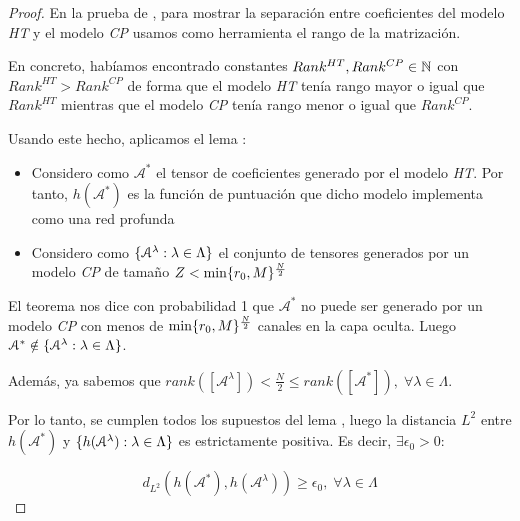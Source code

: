 \begin{proof}

    En la prueba de , para mostrar la separación entre coeficientes del modelo \textit{HT} y el modelo \textit{CP} usamos como herramienta el rango de la matrización.

    En concreto, habíamos encontrado constantes $Rank^{HT}, Rank^{CP} \in \mathbb{N}$ con $Rank^{HT} > Rank^{CP}$ de forma que el modelo \textit{HT} tenía rango mayor o igual que $Rank^{HT}$ mientras que el modelo \textit{CP} tenía rango menor o igual que $Rank^{CP}$.

    Usando este hecho, aplicamos el lema :

    \begin{itemize}
        \item Considero como $\mathcal{A}^*$ el tensor de coeficientes generado por el modelo \textit{HT}. Por tanto, $h(\mathcal{A}^*)$ es la función de puntuación que dicho modelo implementa como una red profunda
        \item Considero como $\{ \mathcal{A}^\lambda: \lambda \in \Lambda \}$ el conjunto de tensores generados por un modelo \textit{CP} de tamaño $Z < \min \{ r_0, M \}^{\frac{N}{2}}$
    \end{itemize}

    El teorema  nos dice con probabilidad 1 que $\mathcal{A}^*$ no puede ser generado por un modelo \textit{CP} con menos de $\min \{ r_0, M \}^{\frac{N}{2}}$ canales en la capa oculta. Luego $\mathcal{A}^* \notin \{ \mathcal{A}^\lambda: \lambda \in \Lambda \}$.

    Además, ya sabemos que $rank([\mathcal{A}^\lambda]) < \frac{N}{2} \leq rank([\mathcal{A}^*]), \; \forall \lambda \in \Lambda$.

    Por lo tanto, se cumplen todos los supuestos del lema , luego la distancia $L^2$ entre $h(\mathcal{A}^*)$ y $\{ h(\mathcal{A}^\lambda): \lambda \in \Lambda \}$ es estrictamente positiva. Es decir, $\exists \epsilon_0 > 0:$

    \begin{equation}
        d_{L^2}(h(\mathcal{A}^*), h(\mathcal{A}^\lambda)) \geq \epsilon_0, \; \forall \lambda \in \Lambda
    \end{equation}


\end{proof}
